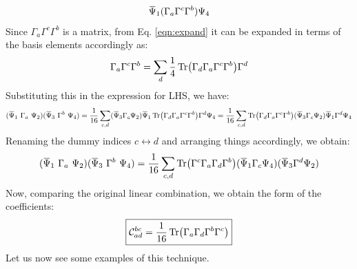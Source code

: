 $$\dadj{\Psi}_1(\Gamma_a\Gamma^c\Gamma^b )\Psi_4$$
Since $\Gamma_a\Gamma^c\Gamma^b$ is a matrix, from Eq. \ref{eqn:expand} it can be expanded in terms of the basis elements accordingly as:
$$\Gamma_a\Gamma^c\Gamma^b =\sum\limits_d \frac{1}{4}\Tr(\Gamma_d \Gamma_a\Gamma^c\Gamma^b)\Gamma^d$$
Substituting this in the expression for LHS, we have:
$$(\bilin{1}{2}{\Gamma_a})(\bilin{3}{4}{\Gamma^b}) =\frac{1}{16} \sum\limits_{c,d} (\dadj{\Psi}_3 \Gamma_c \Psi_2)  \dadj{\Psi}_1 \Tr(\Gamma_d \Gamma_a\Gamma^c\Gamma^b)\Gamma^d \Psi_4 =\frac{1}{16}\sum\limits_{c,d}\Tr(\Gamma_d \Gamma_a\Gamma^c\Gamma^b) (\dadj{\Psi}_3 \Gamma_c \Psi_2)  \dadj{\Psi}_1 \Gamma^d \Psi_4$$
 Renaming the dummy indices $c \leftrightarrow d$ and arranging things accordingly, we obtain:
$$(\bilin{1}{2}{\Gamma_a})(\bilin{3}{4}{\Gamma^b})  =\frac{1}{16}\sum\limits_{c,d}\Tr(\Gamma^{c}\Gamma_a \Gamma_{d}\Gamma^b) ( \dadj{\Psi}_1 \Gamma_c \Psi_4) (\dadj{\Psi}_3 \Gamma^d \Psi_2) $$
Now, comparing the original linear combination, we obtain the form of the coefficients:
$$\boxed{ \mathcal C^{bc}_{ad} =\frac{1}{16} \Tr(\Gamma_a \Gamma_{d}\Gamma^b\Gamma^{c})}$$
Let us now see some examples of this technique. 
